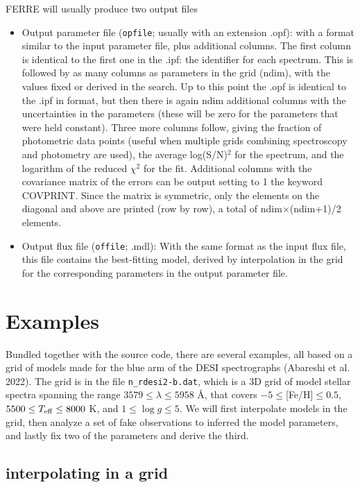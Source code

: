 \documentclass[12pt]{article}
\begin{document}
FERRE will usually produce two output files
\begin{itemize}

\item Output parameter file ({\tt opfile}; usually with an extension .opf): 
with a format similar to the input parameter
file, plus additional columns. The first column is identical to the first one
in the .ipf: the identifier for each spectrum. This is followed by 
as many columns as parameters in the grid (ndim), with the values fixed or 
derived in the search. Up to 
this point the .opf is identical to the .ipf in format, but then there is
again ndim additional columns with the uncertainties in the parameters 
(these will be zero for the parameters that were held constant). Three more 
columns follow, giving the fraction of photometric data points (useful 
when multiple grids combining spectroscopy and photometry are used), the average 
log(S/N)$^2$ for the spectrum, and the logarithm of the reduced $\chi^2$ for the fit. 
Additional columns with the covariance matrix of 
the errors can be output setting to 1 the keyword COVPRINT. Since the matrix is 
symmetric, only the elements on the diagonal and above are printed (row by row), 
a total of ndim$\times$(ndim+1)/2 elements.

\item Output flux file ({\tt offile}; .mdl): With the same format as the input flux file, 
this file contains the best-fitting model, derived by interpolation in the 
grid for the corresponding parameters in the output parameter file.

\end{itemize}

\section{Examples}
\label{test}

Bundled together with the source code, there are several examples, 
all based on a grid of models made for the blue arm of the DESI spectrographs
(Abareshi et al. 2022). The grid is in the file
{\tt n\_rdesi2-b.dat}, which is a 3D grid of model stellar spectra spanning 
the range $3579\le \lambda \le 5958$ \AA,
that covers $-5\le$[Fe/H]$\le 0.5$, $5500\le T_{\rm eff} \le 8000$ K, 
and $1\le \log g \le 5$. We will first interpolate models in the grid, 
then analyze a set of fake observations to inferred the model parameters, and 
lastly fix two of the parameters and derive the third.

\subsection{interpolating in a grid}
\end{document}
